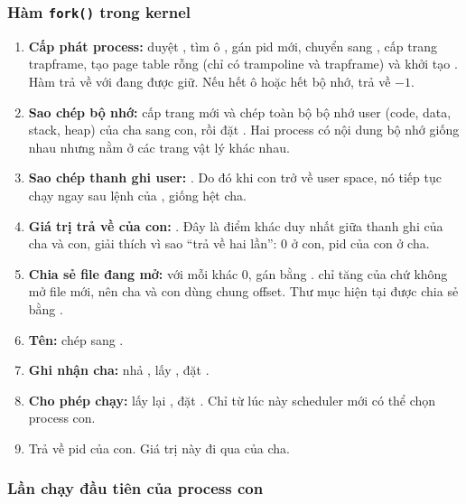 \subsubsection{Hàm \texttt{fork()} trong kernel}

\begin{enumerate}
  \item \textbf{Cấp phát process:}  duyệt , tìm
        ô , gán pid mới, chuyển sang , cấp trang
        trapframe, tạo page table rỗng (chỉ có trampoline và trapframe) và
        khởi tạo . Hàm trả về với  đang được giữ.
        Nếu hết ô hoặc hết bộ nhớ,  trả về $-1$.
  \item \textbf{Sao chép bộ nhớ:}  cấp trang mới và chép toàn
        bộ bộ nhớ user (code, data, stack, heap) của cha sang con, rồi đặt
        . Hai process có nội dung bộ nhớ giống nhau nhưng
        nằm ở các trang vật lý khác nhau.
  \item \textbf{Sao chép thanh ghi user:} .
        Do đó khi con trở về user space, nó tiếp tục chạy ngay sau lệnh
         của , giống hệt cha.
  \item \textbf{Giá trị trả về của con:} . Đây là
        điểm khác duy nhất giữa thanh ghi của cha và con, giải thích vì sao
         ``trả về hai lần'': 0 ở con, pid của con ở cha.
  \item \textbf{Chia sẻ file đang mở:} với mỗi  khác 0,
        gán  bằng .  chỉ tăng
         của  chứ không mở file mới, nên cha và con
        dùng chung offset. Thư mục hiện tại được chia sẻ bằng .
  \item \textbf{Tên:} chép  sang .
  \item \textbf{Ghi nhận cha:} nhả , lấy , đặt
        .
  \item \textbf{Cho phép chạy:} lấy lại , đặt
        . Chỉ từ lúc này scheduler mới có thể chọn
        process con.
  \item Trả về pid của con. Giá trị này đi qua  của cha.
\end{enumerate}

\subsubsection{Lần chạy đầu tiên của process con}

